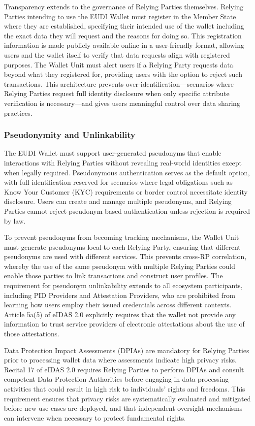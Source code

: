 \documentclass[sigconf,balance,nonacm,authordraft]{acmart}
\begin{document}
Transparency extends to the governance of Relying Parties themselves. Relying Parties intending to use the EUDI Wallet must register in the Member State where they are established, specifying their intended use of the wallet including the exact data they will request and the reasons for doing so. This registration information is made publicly available online in a user-friendly format, allowing users and the wallet itself to verify that data requests align with registered purposes. The Wallet Unit must alert users if a Relying Party requests data beyond what they registered for, providing users with the option to reject such transactions. This architecture prevents over-identification—scenarios where Relying Parties request full identity disclosure when only specific attribute verification is necessary—and gives users meaningful control over data sharing practices.

\subsubsection{Pseudonymity and Unlinkability}

The EUDI Wallet must support user-generated pseudonyms that enable interactions with Relying Parties without revealing real-world identities except when legally required. Pseudonymous authentication serves as the default option, with full identification reserved for scenarios where legal obligations such as Know Your Customer (KYC) requirements or border control necessitate identity disclosure. Users can create and manage multiple pseudonyms, and Relying Parties cannot reject pseudonym-based authentication unless rejection is required by law.

To prevent pseudonyms from becoming tracking mechanisms, the Wallet Unit must generate pseudonyms local to each Relying Party, ensuring that different pseudonyms are used with different services. This prevents cross-RP correlation, whereby the use of the same pseudonym with multiple Relying Parties could enable those parties to link transactions and construct user profiles. The requirement for pseudonym unlinkability extends to all ecosystem participants, including PID Providers and Attestation Providers, who are prohibited from learning how users employ their issued credentials across different contexts. Article 5a(5) of eIDAS 2.0 explicitly requires that the wallet not provide any information to trust service providers of electronic attestations about the use of those attestations.

Data Protection Impact Assessments (DPIAs) are mandatory for Relying Parties prior to processing wallet data where assessments indicate high privacy risks. Recital 17 of eIDAS 2.0 requires Relying Parties to perform DPIAs and consult competent Data Protection Authorities before engaging in data processing activities that could result in high risk to individuals' rights and freedoms. This requirement ensures that privacy risks are systematically evaluated and mitigated before new use cases are deployed, and that independent oversight mechanisms can intervene when necessary to protect fundamental rights.
\end{document}
